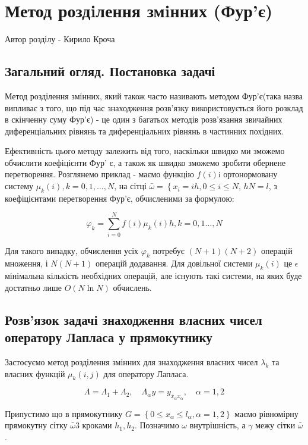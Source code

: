 \chapter{Метод роздiлення змiнних (Фур’є)}

Автор розділу - Кирило Кроча

\section{Загальний огляд. Постановка задачі}

Метод розділення змінних, який також часто називають методом Фур'є(така назва випливає з того, що під час знаходження розв'язку використовується його розклад в скінченну суму Фур'є) - це один з багатьох методів розв'язання звичайних диференціальних рівнянь та диференціальних рівнянь в частинних похідних.

Ефективність цього методу залежить від того, наскільки швидко ми зможемо обчислити коефіцієнти Фур' є, а також як швидко зможемо зробити обернене перетворення. Розглянемо приклад - маємо функцію $f(i) \mathrm{i}$ ортонормовану систему $\mu_{k}(i), k=0,1, \ldots, N$, на сітці $\bar{\omega}=\left\{x_{i}=i h, 0 \leq i \leq N\right.$, $h N=l$, з коефіцієнтами перетворення Фур'є, обчисленими за формулою:

$$
\varphi_{k}=\sum_{i=0}^{N} f(i) \mu_{k}(i) h, k=0,1 \ldots, N
$$

Для такого випадку, обчислення усіх $\varphi_{k}$ потребує $(N+1)(N+2)$ операцій множення, і $N(N+1)$ операцій додавання. Для довільної системи $\mu_{k}(i)$ це $\epsilon$ мінімальна кількість необхідних операцій, але існують такі системи, на яких буде достатньо лише $O(N \ln N)$ обчислень.

\section{Розв'язок задачі знаходження власних чисел оператору Лапласа у прямокутнику}

Застосуємо метод розділення змінних для знаходження власних чисел $\lambda_{k}$ та власних функцій $\mu_{k}(i, j)$ для оператору Лапласа.

$$
\Lambda=\Lambda_{1}+\Lambda_{2}, \quad \Lambda_{\alpha} y=y_{\bar{x}_{\alpha} x_{\alpha}}, \quad \alpha=1,2
$$

Припустимо що в прямокутнику $G=\left\{0 \leq x_{\alpha} \leq l_{\alpha}, \alpha=1,2\right\}$ маємо рівномірну прямокутну сітку $\bar{\omega} 3$ кроками $h_{1}, h_{2}$. Позначимо $\omega$ внутрішність, а $\gamma$ межу сітки $\bar{\omega}$.

